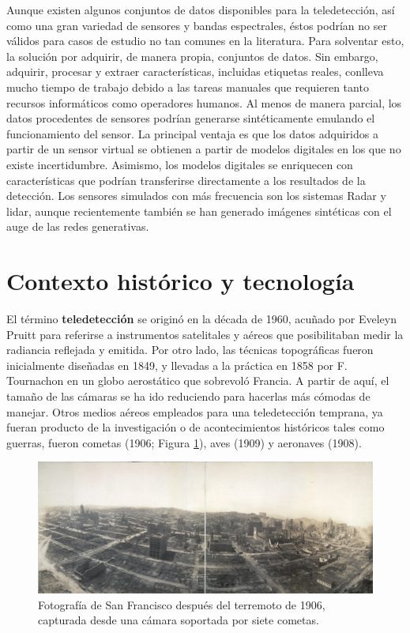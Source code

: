 Aunque existen algunos conjuntos de datos disponibles para la teledetección, así como una gran variedad de sensores y bandas espectrales, éstos podrían no ser válidos para casos de estudio no tan comunes en la literatura. Para solventar esto, la solución por adquirir, de manera propia, conjuntos de datos. Sin embargo, adquirir, procesar y extraer características, incluidas etiquetas reales, conlleva mucho tiempo de trabajo debido a las tareas manuales que requieren tanto recursos informáticos como operadores humanos. Al menos de manera parcial, los datos procedentes de sensores podrían generarse sintéticamente emulando el funcionamiento del sensor. La principal ventaja es que los datos adquiridos a partir de un sensor virtual se obtienen a partir de modelos digitales en los que no existe incertidumbre. Asimismo, los modelos digitales se enriquecen con características que podrían transferirse directamente a los resultados de la detección. Los sensores simulados con más frecuencia son los sistemas Radar y \acrshort{lidar}, aunque recientemente también se han generado imágenes sintéticas con el auge de las redes generativas.

\section{Contexto histórico y tecnología}

El término \textbf{teledetección} se originó en la década de 1960, acuñado por Eveleyn Pruitt para referirse a instrumentos satelitales y aéreos que posibilitaban medir la radiancia reflejada y emitida. Por otro lado, las técnicas topográficas fueron inicialmente diseñadas en 1849, y llevadas a la práctica en 1858 por F. Tournachon en un globo aerostático que sobrevoló Francia. A partir de aquí, el tamaño de las cámaras se ha ido reduciendo para hacerlas más cómodas de manejar. Otros medios aéreos empleados para una teledetección temprana, ya fueran producto de la investigación o de acontecimientos históricos tales como guerras, fueron cometas (1906; Figura \ref{fig:san_francisco_kite_spanish}), aves (1909) y aeronaves (1908). 

\begin{figure}[!ht]
	\includegraphics[width=0.95\linewidth]{figs/introduction/san_francisco_kitecamera.jpg}
	\caption{Fotografía de San Francisco después del terremoto de 1906, capturada desde una cámara soportada por siete cometas. }
    \label{fig:san_francisco_kite_spanish}
\end{figure}

